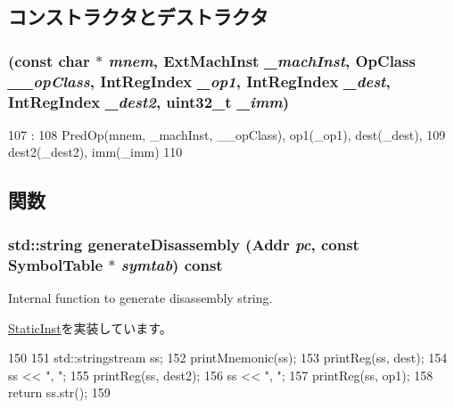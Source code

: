 \subsection{コンストラクタとデストラクタ}
\hypertarget{classMrrcOp_a0c637aed90e17af8765445c08c1d3ca5}{
\subsubsection[{MrrcOp}]{ (const char $\ast$ {\em mnem}, \/  {\bf ExtMachInst} {\em \_\-machInst}, \/  OpClass {\em \_\-\_\-opClass}, \/  {\bf IntRegIndex} {\em \_\-op1}, \/  {\bf IntRegIndex} {\em \_\-dest}, \/  {\bf IntRegIndex} {\em \_\-dest2}, \/  {\bf uint32\_\-t} {\em \_\-imm})}}
\label{classMrrcOp_a0c637aed90e17af8765445c08c1d3ca5}



\begin{DoxyCode}
107                           :
108         PredOp(mnem, _machInst, __opClass), op1(_op1), dest(_dest),
109         dest2(_dest2), imm(_imm)
110     {}

\end{DoxyCode}


\subsection{関数}
\hypertarget{classMrrcOp_a95d323a22a5f07e14d6b4c9385a91896}{
\subsubsection[{generateDisassembly}]{\setlength{\rightskip}{0pt plus 5cm}std::string generateDisassembly ({\bf Addr} {\em pc}, \/  const SymbolTable $\ast$ {\em symtab}) const}}
\label{classMrrcOp_a95d323a22a5f07e14d6b4c9385a91896}
Internal function to generate disassembly string. 

\hyperlink{classStaticInst_ab4a569d2623620c04f8a52bbd91d63b9}{StaticInst}を実装しています。


\begin{DoxyCode}
150 {
151     std::stringstream ss;
152     printMnemonic(ss);
153     printReg(ss, dest);
154     ss << ", ";
155     printReg(ss, dest2);
156     ss << ", ";
157     printReg(ss, op1);
158     return ss.str();
159 }
\end{DoxyCode}



